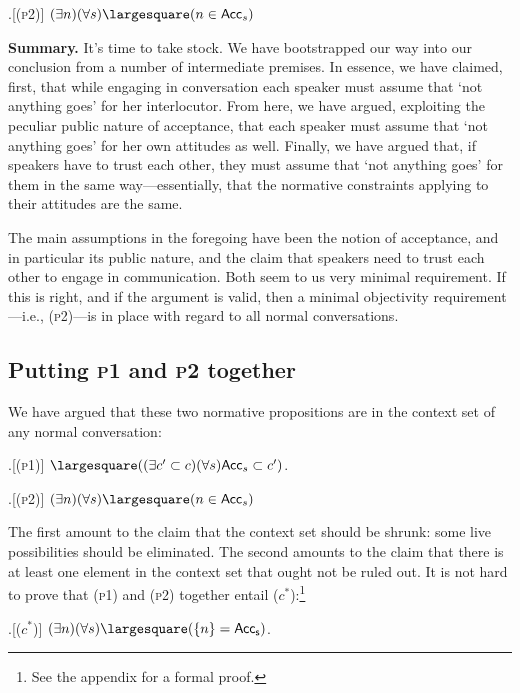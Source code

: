 \documentclass[11pt,article,oneside]{memoir}
\newcommand{\ought}{\largesquare}
\begin{document}
\ex.[(\textsc{p2})] $(\exists n)(\forall s)\ought(n \in \mathsf{Acc}_s)$

\vspace{1\baselineskip}

\textbf{Summary.} It's time to take stock. We have bootstrapped our way into our conclusion from a number of intermediate premises. In essence, we have claimed, first, that while engaging in conversation each speaker must assume that `not anything goes' for her interlocutor. From here, we have argued, exploiting the peculiar public nature of acceptance, that each speaker must assume that `not anything goes' for her own attitudes as well. Finally, we have argued that, if speakers have to trust each other, they must assume that `not anything goes' for them in the same way---essentially, that the normative constraints applying to their attitudes are the same.

The main assumptions in the foregoing have been the notion of acceptance, and in particular its public nature, and the claim that speakers need to trust each other to engage in communication. Both seem to us very minimal requirement. If this is right, and if the argument is valid, then a minimal objectivity requirement---i.e., (\textsc{p2})---is in place with regard to all normal conversations. 

\subsection{Putting \textsc{p1} and \textsc{p2} together}
We have argued that these two normative propositions are in the context set of any normal conversation:

\ex.[(\textsc{p1})] $\ought ((\exists c' \subset c)(\forall s)\mathsf{Acc}_s \subset c')$.

\ex.[(\textsc{p2})] $(\exists n)(\forall s)\ought(n \in \mathsf{Acc}_s)$

The first amount to the claim that the context set should be shrunk: some live possibilities should be eliminated. The second amounts to the claim that there is at least one element in the context set that ought not be ruled out. It is not hard to prove that (\textsc{p1}) and (\textsc{p2}) together entail ($c^*$):\footnote{See the appendix for a formal proof.
}

\a.[($c^*$)] $(\exists n) (  \forall s)  \ought( \{ n\} =  \mathsf{Acc_s})$. 
\end{document}
